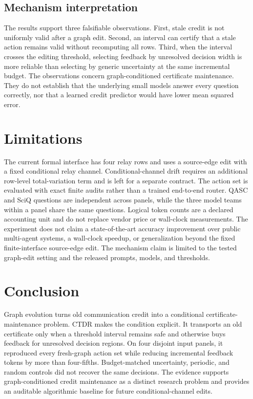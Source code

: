 \documentclass[11pt]{article}
\newcommand{\ctdr}{\textsc{CTDR}}
\begin{document}
\subsection{Mechanism interpretation}
The results support three falsifiable observations. First, stale credit is not uniformly valid after a graph edit. Second, an interval can certify that a stale action remains valid without recomputing all rows. Third, when the interval crosses the editing threshold, selecting feedback by unresolved decision width is more reliable than selecting by generic uncertainty at the same incremental budget. The observations concern graph-conditioned certificate maintenance. They do not establish that the underlying small models answer every question correctly, nor that a learned credit predictor would have lower mean squared error.

\section{Limitations}
The current formal interface has four relay rows and uses a source-edge edit with a fixed conditional relay channel. Conditional-channel drift requires an additional row-level total-variation term and is left for a separate contract. The action set is evaluated with exact finite audits rather than a trained end-to-end router. QASC and SciQ questions are independent across panels, while the three model teams within a panel share the same questions. Logical token counts are a declared accounting unit and do not replace vendor price or wall-clock measurements. The experiment does not claim a state-of-the-art accuracy improvement over public multi-agent systems, a wall-clock speedup, or generalization beyond the fixed finite-interface source-edge edit. The mechanism claim is limited to the tested graph-edit setting and the released prompts, models, and thresholds.

\section{Conclusion}
Graph evolution turns old communication credit into a conditional certificate-maintenance problem. \ctdr{} makes the condition explicit. It transports an old certificate only when a threshold interval remains safe and otherwise buys feedback for unresolved decision regions. On four disjoint input panels, it reproduced every fresh-graph action set while reducing incremental feedback tokens by more than four-fifths. Budget-matched uncertainty, periodic, and random controls did not recover the same decisions. The evidence supports graph-conditioned credit maintenance as a distinct research problem and provides an auditable algorithmic baseline for future conditional-channel edits.
\end{document}
